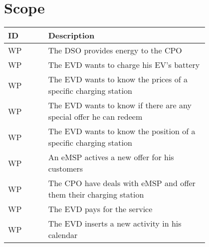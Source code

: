 \section{Scope}
\label{sec:scope}
\setcounter{wp}{1}
\newcommand{\cwp}{\thewp\stepcounter{wp}}
\begin{table}[H]
    \begin{center}
        \begin{tabular}{ |l|p{0.8\linewidth}| }
            \hline
            \textbf{ID} & \textbf{Description}                                               \\
            \hline
            WP\cwp      & The DSO provides energy to the CPO                                 \\
            \hline
            WP\cwp      & The EVD wants to charge his EV's battery                           \\
            \hline
            WP\cwp      & The EVD wants to know the prices of a specific charging station    \\
            \hline
            WP\cwp      & The EVD wants to know if there are any special offer he can redeem \\
            \hline
            WP\cwp      & The EVD wants to know the position of a specific charging station  \\
            \hline
            WP\cwp      & An eMSP actives a new offer for his customers                      \\
            \hline
            WP\cwp      & The CPO have deals with eMSP and offer them their charging station \\
            \hline
            WP\cwp      & The EVD pays for the service                                       \\
            \hline
            WP\cwp      & The EVD inserts a new activity in his calendar                     \\
            \hline

\end{tabular}
\end{center}
\end{table}
